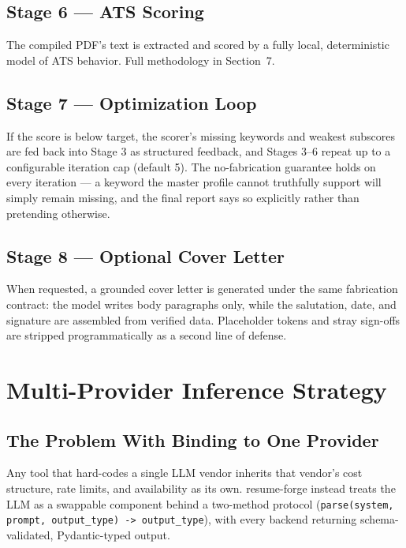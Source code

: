 \documentclass[10.5pt,letterpaper]{article}
\begin{document}
\subsection{Stage 6 --- ATS Scoring}
The compiled PDF's text is extracted and scored by a fully local, deterministic model of ATS
behavior. Full methodology in Section~7.

\subsection{Stage 7 --- Optimization Loop}
If the score is below target, the scorer's missing keywords and weakest subscores are fed
back into Stage 3 as structured feedback, and Stages 3--6 repeat up to a configurable
iteration cap (default 5). The no-fabrication guarantee holds on every iteration --- a
keyword the master profile cannot truthfully support will simply remain missing, and the
final report says so explicitly rather than pretending otherwise.

\subsection{Stage 8 --- Optional Cover Letter}
When requested, a grounded cover letter is generated under the same fabrication contract: the
model writes body paragraphs only, while the salutation, date, and signature are assembled
from verified data. Placeholder tokens and stray sign-offs are stripped programmatically as a
second line of defense.

\newpage

\section{Multi-Provider Inference Strategy}

\subsection{The Problem With Binding to One Provider}
Any tool that hard-codes a single LLM vendor inherits that vendor's cost structure, rate
limits, and availability as its own. resume-forge instead treats the LLM as a swappable
component behind a two-method protocol (\texttt{parse(system, prompt, output\_type) ->
output\_type}), with every backend returning schema-validated, Pydantic-typed output.
\end{document}
